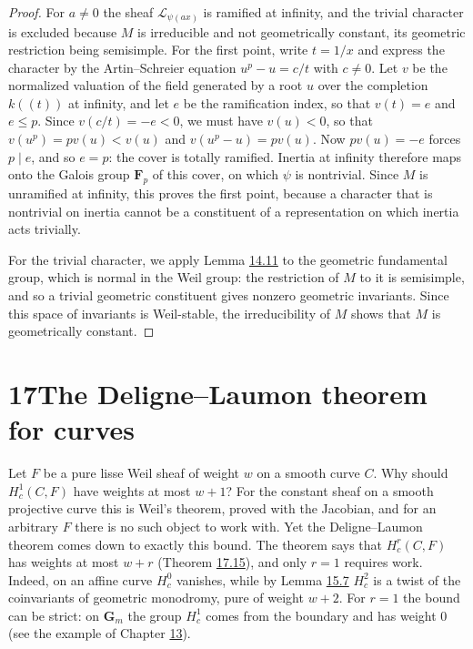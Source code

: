 \documentclass[11pt]{article}
\begin{document}
\begin{proof}[{Proof}]\label{bp222}%
For \(a\ne0\) the sheaf \(\mathcal L_{\psi(ax)}\) is ramified at infinity, and the trivial character is excluded because \(M\) is irreducible and not geometrically constant, its geometric restriction being semisimple. For the first point, write \(t=1/x\) and express the character by the Artin–Schreier equation \(u^p-u=c/t\) with \(c\ne0\). Let \(v\) be the normalized valuation of the field generated by a root \(u\) over the completion \(k((t))\) at infinity, and let \(e\) be the ramification index, so that \(v(t)=e\) and \(e\le p\). Since \(v(c/t)=-e<0\), we must have \(v(u)<0\), so that \(v(u^p)=pv(u)<v(u)\) and \(v(u^p-u)=pv(u)\). Now \(pv(u)=-e\) forces \(p\mid e\), and so \(e=p\): the cover is totally ramified. Inertia at infinity therefore maps onto the Galois group \(\mathbf F_p\) of this cover, on which \(\psi\) is nontrivial. Since \(M\) is unramified at infinity, this proves the first point, because a character that is nontrivial on inertia cannot be a constituent of a representation on which inertia acts trivially.

For the trivial character, we apply Lemma \hyperref[bp75]{14.11} to the geometric fundamental group, which is normal in the Weil group: the restriction of \(M\) to it is semisimple, and so a trivial geometric constituent gives nonzero geometric invariants. Since this space of invariants is Weil-stable, the irreducibility of \(M\) shows that \(M\) is geometrically constant.
\end{proof}



\section*{\texorpdfstring{17\quad The Deligne–Laumon theorem for curves}{17 The Deligne–Laumon theorem for curves}}
\label{bp223}%
\label{bp224}%
Let \(F\) be a pure lisse Weil sheaf of weight \(w\) on a smooth curve \(C\). Why should \(H^1_c(C,F)\) have weights at most \(w+1\)? For the constant sheaf on a smooth projective curve this is Weil's theorem, proved with the Jacobian, and for an arbitrary \(F\) there is no such object to work with. Yet the Deligne–Laumon theorem comes down to exactly this bound. The theorem says that \(H^r_c(C,F)\) has weights at most \(w+r\) (Theorem \hyperref[bp269]{17.15}), and only \(r=1\) requires work. Indeed, on an affine curve \(H^0_c\) vanishes, while by Lemma \hyperref[bp140]{15.7} \(H^2_c\) is a twist of the coinvariants of geometric monodromy, pure of weight \(w+2\). For \(r=1\) the bound can be strict: on \(\mathbf G_m\) the group \(H^1_c\) comes from the boundary and has weight \(0\) (see the example of Chapter \hyperref[bp3]{13}).
\end{document}
